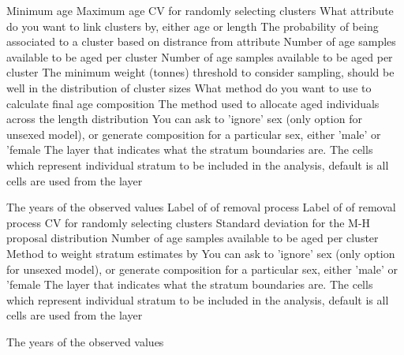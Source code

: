  {Minimum age}
 {Maximum age}
 {CV for randomly selecting clusters}
 {What attribute do you want to link clusters by, either age or length}
 {The probability of being associated to a cluster based on distrance from attribute}
 {Number of age samples available to be aged per cluster}
 {Number of age samples available to be aged per cluster}
 {The minimum weight (tonnes) threshold to consider sampling, should be well in the distribution of cluster sizes}
 {What method do you want to use to calculate final age composition}
 {The method used to allocate aged individuals across the length distribution}
 {You can ask to 'ignore' sex (only option for unsexed model), or generate composition for a particular sex, either 'male' or 'female}
 {The layer that indicates what the stratum boundaries are.}
 {The cells which represent individual stratum to be included in the analysis, default is all cells are used from the layer}
\par\textbf{}\par
{} {The years of the observed values}
 {Label of of removal process}
 {Label of of removal process}
 {CV for randomly selecting clusters}
 {}
 {Standard deviation for the M-H proposal distribution}
 {Number of age samples available to be aged per cluster}
 {Method to weight stratum estimates by}
 {You can ask to 'ignore' sex (only option for unsexed model), or generate composition for a particular sex, either 'male' or 'female}
 {The layer that indicates what the stratum boundaries are.}
 {The cells which represent individual stratum to be included in the analysis, default is all cells are used from the layer}
\par\textbf{}\par
{} {The years of the observed values}
